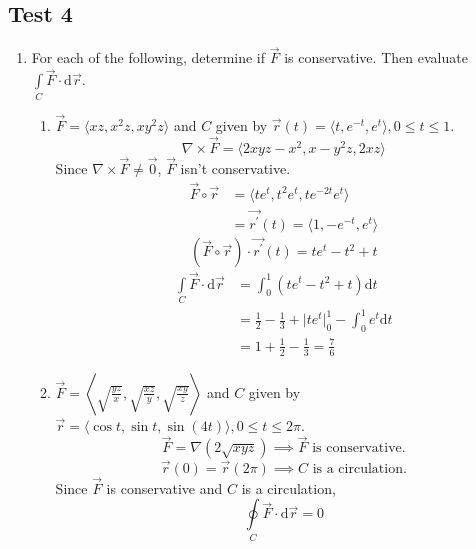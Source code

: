 \subsection{Test 4}
\begin{enumerate}
	\item For each of the following, determine if $\vec{F}$ is conservative. Then evaluate $\int\limits_{C}{\vec{F}\cdot\mathrm{d}\vec{r}}$.
	\begin{enumerate}[label=\alph*.]
		\item $\vec{F} = \langle xz, x^2z, xy^2z \rangle$ and $C$ given by $\vec{r}(t) = \langle t, e^{-t}, e^t\rangle, 0 \leq t \leq 1$.
		\begin{equation*}
			\nabla \times \vec{F} = \langle 2xyz-x^2, x-y^2z, 2xz \rangle	
		\end{equation*}
		Since $\nabla \times \vec{F} \neq \vec{0}$, $\vec{F}$ isn't conservative.
		\begin{align*}
			\vec{F}\circ\vec{r} &= \langle te^t, t^2e^t, te^{-2t}e^t \rangle \\
			&= \vec{r^\prime}(t) = \langle 1, -e^{-t}, e^t\rangle
		\end{align*}
		\begin{equation*}
			\left(\vec{F}\circ\vec{r}\right) \cdot \vec{r^\prime}(t) = te^t - t^2 + t
		\end{equation*}
		\begin{align*}
			\int\limits_{C}{\vec{F} \cdot \mathrm{d}\vec{r}} &= \int_{0}^{1}{\left(te^t - t^2 + t\right)\mathrm{d}t} \\
			&= \frac{1}{2} - \frac{1}{3} + \lvert te^t\rvert_{0}^{1} - \int_{0}^{1}{e^t\mathrm{d}t} \\
			&= 1 + \frac{1}{2} - \frac{1}{3} = \frac{7}{6}	
		\end{align*}
		
		\item $\vec{F} = \left< \sqrt{\frac{yz}{x}}, \sqrt{\frac{xz}{y}}, \sqrt{\frac{xy}{z}} \right>$ and $C$ given by $\vec{r} = \langle \cos{t}, \sin{t}, \sin{(4t)} \rangle, 0 \leq t \leq 2\pi$.
		\begin{equation*}
			\vec{F} = \nabla(2\sqrt{xyz}) \implies \vec{F}  \text{ is conservative.}
		\end{equation*}
		\begin{equation*}
			\vec{r}(0) = \vec{r}(2\pi) \implies C \text{ is a circulation.}
		\end{equation*}
		Since $\vec{F}$ is conservative and $C$ is a circulation,
		\begin{equation*}
			\oint\limits_{C}{\vec{F} \cdot \mathrm{d}\vec{r}} = 0
		\end{equation*}
		

\end{enumerate}
\end{enumerate}
